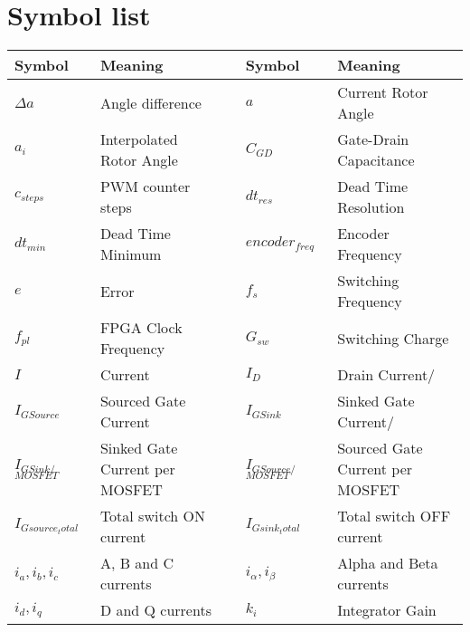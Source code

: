 \section{Symbol list}
\label{sec:symbol_list}

\begin{table}[H]
\centering
\footnotesize
\begin{tabular}{|p{2cm}|p{4.5cm}|l|p{2cm}|p{4.5cm}|} \hline
\textbf{Symbol}      & \textbf{Meaning}                 && \textbf{Symbol}       & \textbf{Meaning}                          \\ \hline
$\Delta a$           & Angle difference                 && $a$                   & Current Rotor Angle              \\ \hline
$a_i$                & Interpolated Rotor Angle         && $C_{GD}$              & Gate-Drain Capacitance           \\ \hline
$c_{steps}$          & PWM counter steps                && $dt_{res}$            & Dead Time Resolution             \\ \hline
$dt_{min}$           & Dead Time Minimum                &&  $encoder_{freq}$     & Encoder Frequency                \\ \hline
$e$                  & Error                            &&  $f_{s}$              & Switching Frequency              \\ \hline
$f_{pl}$             & FPGA Clock Frequency             &&  $G_{sw}$             & Switching Charge                 \\ \hline
$I$                  & Current                          &&  $I_{D}$              & Drain Current/                   \\ \hline
$I_{GSource}$        & Sourced Gate Current             &&  $I_{GSink}$          & Sinked Gate Current/             \\ \hline
$I_{GSink/}$ $_{MOSFET}$ & Sinked Gate Current per MOSFET &&  $I_{GSource/}$ $_{MOSFET}$ & Sourced Gate Current per MOSFET  \\ \hline
$I_{Gsource_total}$  & Total switch ON current          &&  $I_{Gsink_total}$    & Total switch OFF current         \\ \hline
$i_a,i_b,i_c$        & A, B and C currents              &&  $i_\alpha, i_\beta$  & Alpha and Beta currents          \\ \hline
$i_d, i_q$           & D and Q currents                 &&  $k_i$                & Integrator Gain                  \\ \hline

\end{tabular}
\end{table}
